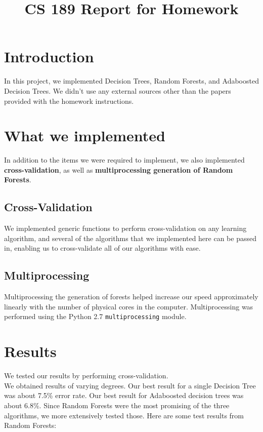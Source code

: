 \documentclass[11pt]{article}
\title{CS 189 Report for Homework \Homework}
\author{\Name}
\begin{document}
\maketitle

\section{Introduction}

In this project, we implemented Decision Trees, Random Forests, and Adaboosted Decision Trees. We didn't use any external sources other than the papers provided with the homework instructions. 

\section{What we implemented}

In addition to the items we were required to implement, we also implemented \textbf{cross-validation}, as well as \textbf{multiprocessing generation of Random Forests}. 

\subsection{Cross-Validation}
We implemented generic functions to perform cross-validation on any learning algorithm, and several of the algorithms that we implemented here can be passed in, enabling us to cross-validate all of our algorithms with ease. 

\subsection{Multiprocessing}
Multiprocessing the generation of forests helped increase our speed approximately linearly with the number of physical cores in the computer. Multiprocessing was performed using the Python 2.7 \texttt{multiprocessing} module. 

\section{Results}

We tested our results by performing cross-validation. \\

We obtained results of varying degrees. Our best result for a single Decision Tree was about 7.5\% error rate. Our best result for Adaboosted decision trees was about 6.8\%. Since Random Forests were the most promising of the three algorithms, we more extensively tested those. Here are some test results from Random Forests: \\
\end{document}
